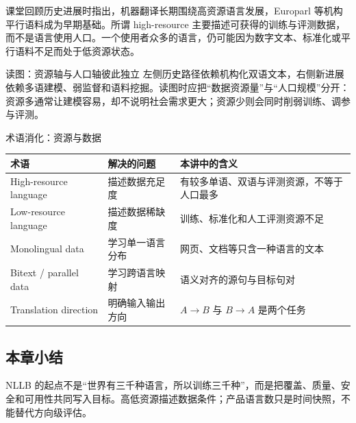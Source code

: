 课堂回顾历史进展时指出，机器翻译长期围绕高资源语言发展，Europarl 等机构平行语料成为早期基础。所谓 high-resource 主要描述可获得的训练与评测数据，而不是语言使用人口。一个使用者众多的语言，仍可能因为数字文本、标准化或平行语料不足而处于低资源状态。


\begin{knowledgebox}{读图：资源轴与人口轴彼此独立}
左侧历史路径依赖机构化双语文本，右侧新进展依赖多语建模、弱监督和语料挖掘。读图时应把“数据资源量”与“人口规模”分开：资源多通常让建模容易，却不说明社会需求更大；资源少则会同时削弱训练、调参与评测。
\end{knowledgebox}

\begin{knowledgebox}{术语消化：资源与数据}
\begin{tabularx}{\textwidth}{@{}L{0.21\textwidth}L{0.28\textwidth}X@{}}
\toprule
术语 & 解决的问题 & 本讲中的含义 \\
\midrule
High-resource language & 描述数据充足度 & 有较多单语、双语与评测资源，不等于人口最多 \\
Low-resource language & 描述数据稀缺度 & 训练、标准化和人工评测资源不足 \\
Monolingual data & 学习单一语言分布 & 网页、文档等只含一种语言的文本 \\
Bitext / parallel data & 学习跨语言映射 & 语义对齐的源句与目标句对 \\
Translation direction & 明确输入输出方向 & $A\rightarrow B$ 与 $B\rightarrow A$ 是两个任务 \\
\bottomrule
\end{tabularx}
\end{knowledgebox}

\subsection{本章小结}

NLLB 的起点不是“世界有三千种语言，所以训练三千种”，而是把覆盖、质量、安全和可用性共同写入目标。高低资源描述数据条件；产品语言数只是时间快照，不能替代方向级评估。


